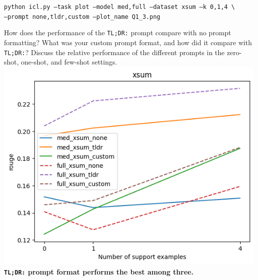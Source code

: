 \documentclass[12pt]{article}
\begin{document}
\begin{enumerate}
        \texttt{\small python icl.py --task plot --model med,full --dataset xsum --k 0,1,4 \textbackslash \\
        \phantom{asdf}--prompt none,tldr,custom --plot\_name Q1\_3.png}

        How does the performance of the \texttt{TL;DR:} prompt compare with no prompt formatting? What was your custom prompt format, and how did it compare with \texttt{TL;DR:}? Discuss the relative performance of the different prompts in the zero-shot, one-shot, and few-shot settings.\\
        \includegraphics[width=\linewidth]{hw3_starter_code/starter_code/Q1_3.png}
        \textbf{\color{red}\texttt{TL;DR:} prompt format performs the best among three.}

    \end{enumerate}
\end{document}
